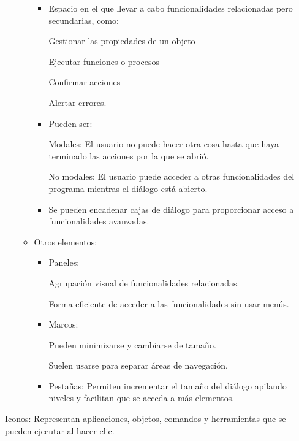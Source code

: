 \documentclass[12pt, twoside, openright]{report} %
\begin{document}
\begin{itemize}
\begin{itemize}
            \begin{itemize}
            
            \item
              Espacio en el que llevar a cabo funcionalidades
              relacionadas pero secundarias, como:

                Gestionar las propiedades de un objeto

				Ejecutar funciones o procesos

				Confirmar acciones

				Alertar errores.

				\item
              Pueden ser:
			  
                Modales: El usuario no puede hacer otra cosa hasta que
                haya terminado las acciones por la que se abrió.

				No modales: El usuario puede acceder a otras
                funcionalidades del programa mientras el diálogo está
                abierto.

				\item
              Se pueden encadenar cajas de diálogo para proporcionar
              acceso a funcionalidades avanzadas.
            \end{itemize}
          \item
            Otros elementos:

            \begin{itemize}
            
            \item
              Paneles:
			  
                Agrupación visual de funcionalidades relacionadas.

				Forma eficiente de acceder a las funcionalidades sin
                usar menús.

				\item
              Marcos:
			  
                Pueden minimizarse y cambiarse de tamaño.

				Suelen usarse para separar áreas de navegación.

				\item
              Pestañas:
                Permiten incrementar el tamaño del diálogo apilando
                niveles y facilitan que se acceda a más elementos.

			\end{itemize}
          \end{itemize}
        \end{itemize}
\pagebreak
		Iconos: Representan aplicaciones, objetos, comandos y
        herramientas que se pueden ejecutar al hacer clic.
\end{document}
